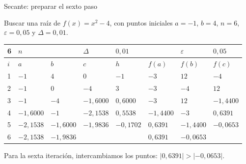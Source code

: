 \documentclass[original_version/main.tex]{subfiles}
\begin{document}
\begin{frame}[t]{Secante: preparar el sexto paso}
\begin{minipage}[t][13mm][t]{\textwidth}\small Buscar una raíz de $f(x)=x^2-4$, con puntos iniciales $a=-1$, $b=4$, $n=6$, $\varepsilon=0{,}05$ y $\Delta=0{,}01$.\end{minipage}\par{\scriptsize\setlength{\tabcolsep}{2pt}\renewcommand{\arraystretch}{1}\begin{center}\begin{tabular}{|C{.04\textwidth}|C{.112\textwidth}|C{.112\textwidth}|C{.112\textwidth}|C{.112\textwidth}|C{.112\textwidth}|C{.112\textwidth}|C{.112\textwidth}|}
\hline
\rule{0pt}{4.3mm}6 & $n$ &  &  $\Delta$  & $0{,}01$ &  & $\varepsilon$ & $0{,}05$\\\hline
\rule{0pt}{4.3mm}$i$ & $a$ & $b$ & $c$ & $h$ & $f(a)$ & $f(b)$ & $f(c)$\\\hline
\rule{0pt}{4.3mm}1 & $-1$ & $4$ & $0$ & $-1$ & $-3$ & $12$ & $-4$\\\hline
\rule{0pt}{4.3mm}2 & $-1$ & $0$ & $-4$ & $3$ & $-3$ & $-4$ & $12$\\\hline
\rule{0pt}{4.3mm}3 & $-1$ & $-4$ & $-1{,}6000$ & $0{,}6000$ & $-3$ & $12$ & $-1{,}4400$\\\hline
\rule{0pt}{4.3mm}4 & $-1{,}6000$ & $-1$ & $-2{,}1538$ & $0{,}5538$ & $-1{,}4400$ & $-3$ & $0{,}6391$\\\hline
\rule{0pt}{4.3mm}5 & $-2{,}1538$ & $-1{,}6000$ & $-1{,}9836$ & $-0{,}1702$ & $0{,}6391$ & $-1{,}4400$ & $-0{,}0653$\\\hline
\rule{0pt}{4.3mm}6 & $-2{,}1538$ & $-1{,}9836$ &  &  & $0{,}6391$ & $-0{,}0653$ & \\\hline
\end{tabular}\end{center}}\begin{minipage}[t][10mm][t]{\textwidth}\footnotesize Para la sexta iteración, intercambiamos los puntos: $|0{,}6391|>|-0{,}0653|$.\end{minipage}
\end{frame}
\end{document}

